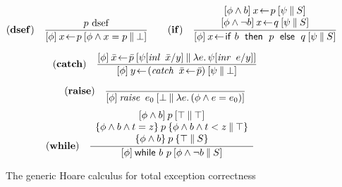 \begin{figure}
{{\begin{displaymath}
\NRule{dsef}{p~\textrm{dsef}
}
{\ETHTriple{\phi}{x\leteq p}{\phi\land x=p}{\bot}}
%
\qquad
\NRule{if}{\begin{array}{c}
    \ETHTriple{\phi\land b}{x\leteq p}{\psi}{S}\\
    \ETHTriple{\phi\land  \lnot b}{x\leteq q}{\psi}{S}
\end{array}}{\ETHTriple{\phi}{x\leteq \If\ b\ \Then\ p\ \Else\ q}{\psi}{S}}
\end{displaymath}

\begin{displaymath}
(\mathbf{catch})\quad\frac{\displaystyle 
[\phi]\:\bar x\!\gets\!\bar p\:[\psi[\mathit{inl}\,\ \bar x/y]\:\|\:\lambda
  e.\,\psi[\mathit{inr}\,\ e/y]]
}{\displaystyle 
[\phi]\:y\!\gets\!(\mathit{catch}\,\ \bar x\!\gets\! \bar p)\:[\psi\:\|\:\bot]
}
\end{displaymath}

\begin{displaymath}
(\mathbf{raise})\quad\frac{\displaystyle }{\displaystyle 
[\phi]\:\mathit{raise}\,\ e_0\:[\bot\:\|\:{\lambda e.\,(\phi\land e=e_0)}]
}
\end{displaymath}
\begin{displaymath}
%
\NRule{while}{
  \begin{array}{c}
    \ETHTriple{\phi \land b}{p}{\top}{\top}\\
    \EPHTriple{\phi \land b \land t = z}{p}{\phi \land b\land t < z}{\top}\\
    \EPHTriple{\phi \land b}{p}{\top}{S}
  \end{array}}
{
\ETHTriple{\phi}{\While \ b\ p}{\phi \land \lnot b}{S}
}
\quad
\end{displaymath}
}}
  \caption{The generic Hoare calculus for total exception correctness}
  \label{fig:exc-partial-hoare}
\end{figure}



